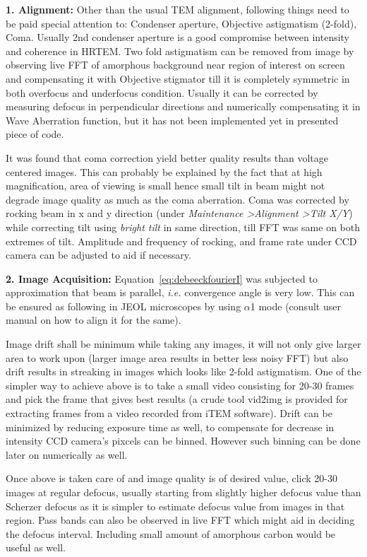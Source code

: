 \textbf{1. Alignment:}
Other than the usual TEM alignment, following things need to be paid special attention to: Condenser aperture, Objective astigmatism (2-fold), Coma.
Usually 2nd condenser aperture is a good compromise between intensity and coherence in HRTEM.
Two fold astigmatism can be removed from image by observing live FFT of amorphous background near region of interest on screen and compensating it with Objective stigmator till it is completely symmetric in both overfocus and underfocus condition.
Usually it can be corrected by measuring defocus in perpendicular directions and  numerically compensating it in Wave Aberration function\cite{meyer_symmetric}, but it has not been implemented yet in presented piece of code. 

It was found that coma correction yield better quality results than voltage centered images.
This can probably be explained by the fact that at high magnification, area of viewing is small hence small tilt in beam might not degrade image quality as much as the coma aberration.
Coma was corrected by rocking beam in x and y direction (under \textit{Maintenance \textgreater Alignment \textgreater Tilt X/Y}) while correcting tilt using \textit{bright tilt} in same direction, till FFT was same on both extremes of tilt.
Amplitude and frequency of rocking, and frame rate under CCD camera can be adjusted to aid if necessary. 

\textbf{2. Image Acquisition:}
Equation~\ref{eq:debeeckfourierI} was subjected to approximation that beam is parallel, \textit{i.e.} convergence angle is very low.
This can be ensured as following in JEOL microscopes by using $\alpha$1 mode (consult user manual on how to align it for the same).

Image drift shall be minimum while taking any images, it will not only give larger area to work upon (larger image area results in better less noisy FFT) but also drift results in streaking in images which looks like 2-fold astigmatism.
One of the simpler way to achieve above is to take a small video consisting for 20-30 frames and pick the frame that gives best results (a crude tool vid2img is provided for extracting frames from a video recorded from iTEM software).
Drift can be minimized by reducing exposure time as well, to compensate for decrease in intensity CCD camera's pixcels can be binned.
However such binning can be done later on numerically as well.

Once above is taken care of and image quality is of desired value, click 20-30 images at regular defocus, usually starting from slightly higher defocus value than Scherzer defocus as it is simpler to estimate defocus value from images in that region.
Pass bands can also be observed in live FFT which might aid in deciding the defocus interval.
Including small amount of amorphous carbon would be useful as well.

